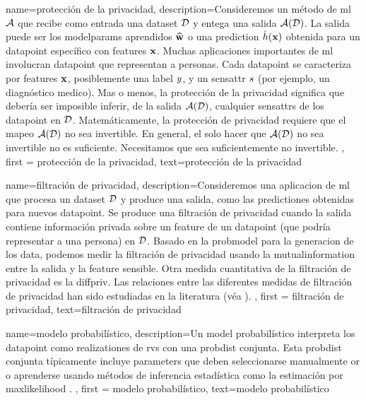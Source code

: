 {name=protección de la privacidad,
    description={Consideremos un método de \gls{ml}  $\mathcal{A}$ que recibe como entrada 
	 una \gls{dataset} $\mathcal{D}$ y entega una salida $\mathcal{A}(\mathcal{D})$. La salida 
	 puede ser los \gls{modelparams} aprendidos $\widehat{{\bf w}}$ o una \gls{prediction} 
	 $\hat{h}({\bf x})$ obtenida para un \gls{datapoint} específico con \gls{feature}s 
	 ${\bf x}$. Muchas aplicaciones importantes de \gls{ml} involucran \gls{datapoint} 
		que representan a personas. Cada \gls{datapoint} se caracteriza por \gls{feature}s ${\bf x}$, 
		posiblemente una \gls{label} $y$, y un \gls{sensattr} $s$ (por ejemplo, un diagnóstico medico). 
		Mas o menos, la protección de la privacidad significa que debería ser imposible inferir, de la salida $\mathcal{A}(\mathcal{D})$, 
		cualquier \gls{sensattr}s de los \gls{datapoint} en $\mathcal{D}$. Matemáticamente, la protección de privacidad requiere que  
		el mapeo $\mathcal{A}(\mathcal{D})$ no sea invertible. En general, el solo hacer que  $\mathcal{A}(\mathcal{D})$ no sea invertible 
		no es suficiente. Necesitamos que sea suficientemente no invertible. 
	}, 
	first = {protección de la privacidad}, text={protección de la privacidad} 
}

{
	name=filtración de privacidad,
	description={Consideremos una aplicacion de \gls{ml} que procesa un
	\gls{dataset} $\mathcal{D}$ y produce una salida, como las \gls{prediction}es 
	obtenidas para nuevos \gls{datapoint}. Se produce una filtración de privacidad 
	cuando la salida contiene información privada sobre un \gls{feature} de un 
	\gls{datapoint} (que podría representar a una persona) en $\mathcal{D}$. Basado en la \gls{probmodel} 
	para la generacion de los \gls{data}, podemos medir la filtración de privacidad usando la \gls{mutualinformation} 
	entre la salida y la \gls{feature} sensible. Otra medida cuantitativa de la filtración de privacidad 
	es la \gls{diffpriv}. Las relaciones entre las diferentes medidas de filtración de privacidad han sido estudiadas en la literatura (véa \cite{InfThDiffPriv}). 
	}, 
	first = {filtración de privacidad}, text={filtración de privacidad} 
}



{
	name=modelo probabilístico,
	description={Un \gls{model} probabilístico interpreta los \gls{datapoint}
		como \gls{realization}es de \gls{rv}s con una \gls{probdist} conjunta. Esta \gls{probdist} conjunta típicamente 
		incluye \gls{parameters} que deben seleccionarse manualmente or o aprenderse usando métodos de inferencia estadística  
		como la estimación por \gls{maxlikelihood} \cite{LC}. }, 
	first = {modelo probabilístico}, text={modelo probabilístico} 
}



